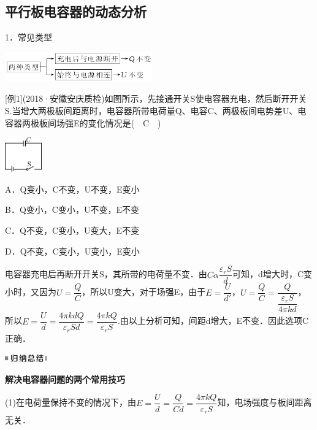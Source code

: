 \newpage
\subsection{平行板电容器的动态分析}

1．常见类型

\begin{center}\includegraphics[width=2.51042in,height=0.5in]{media/image295.png}\end{center}

{[}例1{]}(2018·安徽安庆质检)如图所示，先接通开关S使电容器充电，然后断开开关S.当增大两极板间距离时，电容器所带电荷量Q、电容C、两极板间电势差U、电容器两极板间场强E的变化情况是(　C　)

\begin{center}\includegraphics[width=0.625in,height=0.58333in]{media/image296.png}\end{center}

A．Q变小，C不变，U不变，E变小

B．Q变小，C变小，U不变，E不变

C．Q不变，C变小，U变大，E不变

D．Q不变，C变小，U变小，E变小

\begin{solution}
	电容器充电后再断开开关S，其所带的电荷量不变．由$C \alpha \dfrac{\varepsilon_{r} S}{d}$可知，d增大时，C变小时，又因为$U=\dfrac{Q}{C}$，所以U变大，对于场强E，由于$E=\dfrac{U}{d'}$，$U=\dfrac{Q}{C}=\dfrac{Q}{\dfrac{\varepsilon_{r} S}{4 \pi k d}}$，所以$E=\dfrac{U}{d}=\dfrac{4 \pi k d Q}{\varepsilon_{r} S d}=\dfrac{4 \pi k Q}{\varepsilon_{r} S}$.由以上分析可知，间距d增大，E不变．因此选项C正确．
\end{solution}
\begin{center}\includegraphics[width=0.70833in,height=0.125in]{media/image13.png}

\textbf{解决电容器问题的两个常用技巧}
\end{center}


(1)在电荷量保持不变的情况下，由$E=\dfrac{U}{d}=\dfrac{Q}{Cd} =\dfrac{4 \pi k Q}{\varepsilon_{r} S}$知，电场强度与板间距离无关．

